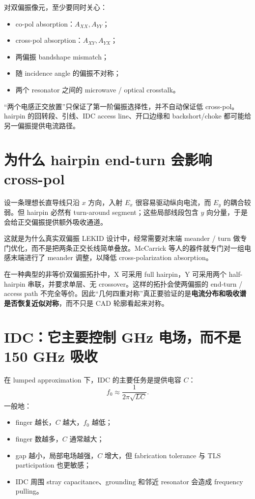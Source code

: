 \documentclass[11pt,a4paper,openany]{ctexrep}
\begin{document}
对双偏振像元，至少要同时关心：
\begin{itemize}
  \item co-pol absorption：$A_{XX},A_{YY}$；
  \item cross-pol absorption：$A_{XY},A_{YX}$；
  \item 两偏振 bandshape mismatch；
  \item 随 incidence angle 的偏振不对称；
  \item 两个 resonator 之间的 microwave / optical crosstalk。
\end{itemize}

\begin{mistakebox}
“两个电感正交放置”只保证了第一阶偏振选择性，并不自动保证低 cross-pol。hairpin 的回转段、引线、IDC access line、开口边缘和 backshort/choke 都可能给另一偏振提供电流路径。
\end{mistakebox}

\section{为什么 hairpin end-turn 会影响 cross-pol}

设一条理想长直导线只沿 $x$ 方向，入射 $E_x$ 很容易驱动纵向电流，而 $E_y$ 的耦合较弱。但 hairpin 必然有 turn-around segment；这些局部线段包含 $y$ 向分量，于是会给正交偏振提供额外吸收通道。

这就是为什么真实双偏振 LEKID 设计中，经常需要对末端 meander / turn 做专门优化，而不是把两条正交长线简单叠放。McCarrick 等人的器件就专门对一组电感末端进行了 meander 调整，以降低 cross-polarization absorption。

\begin{projectbox}
在一种典型的非等价双偏振拓扑中，X 可采用 full hairpin，Y 可采用两个 half-hairpin 串联，并要求单层、无 crossover。这样的拓扑会使两偏振的 end-turn / access path 不完全等价。因此“几何四重对称”真正要验证的是\textbf{电流分布和吸收谱是否恢复近似对称}，而不只是 CAD 轮廓看起来对称。
\end{projectbox}

\section{IDC：它主要控制 GHz 电场，而不是 150 GHz 吸收}

在 lumped approximation 下，IDC 的主要任务是提供电容 $C$：
\[
f_0\approx\frac{1}{2\pi\sqrt{LC}}.
\]
一般地：
\begin{itemize}
  \item finger 越长，$C$ 越大，$f_0$ 越低；
  \item finger 数越多，$C$ 通常越大；
  \item gap 越小，局部电场越强，$C$ 增大，但 fabrication tolerance 与 TLS participation 也更敏感；
  \item IDC 周围 stray capacitance、grounding 和邻近 resonator 会造成 frequency pulling。
\end{itemize}
\end{document}
